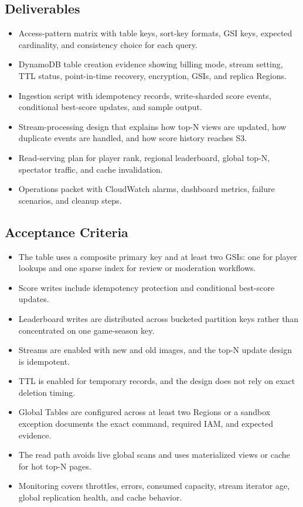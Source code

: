 \subsection*{Deliverables}
\begin{itemize}
    \item Access-pattern matrix with table keys, sort-key formats, GSI keys, expected cardinality, and consistency choice for each query.
    \item DynamoDB table creation evidence showing billing mode, stream setting, TTL status, point-in-time recovery, encryption, GSIs, and replica Regions.
    \item Ingestion script with idempotency records, write-sharded score events, conditional best-score updates, and sample output.
    \item Stream-processing design that explains how top-N views are updated, how duplicate events are handled, and how score history reaches S3.
    \item Read-serving plan for player rank, regional leaderboard, global top-N, spectator traffic, and cache invalidation.
    \item Operations packet with CloudWatch alarms, dashboard metrics, failure scenarios, and cleanup steps.
\end{itemize}

\subsection*{Acceptance Criteria}
\begin{itemize}
    \item The table uses a composite primary key and at least two GSIs: one for player lookups and one sparse index for review or moderation workflows.
    \item Score writes include idempotency protection and conditional best-score updates.
    \item Leaderboard writes are distributed across bucketed partition keys rather than concentrated on one game-season key.
    \item Streams are enabled with new and old images, and the top-N update design is idempotent.
    \item TTL is enabled for temporary records, and the design does not rely on exact deletion timing.
    \item Global Tables are configured across at least two Regions or a sandbox exception documents the exact command, required IAM, and expected evidence.
    \item The read path avoids live global scans and uses materialized views or cache for hot top-N pages.
    \item Monitoring covers throttles, errors, consumed capacity, stream iterator age, global replication health, and cache behavior.
\end{itemize}


